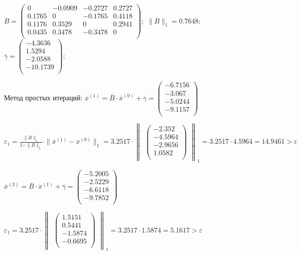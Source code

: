 \documentclass[10pt, a4paper]{scrartcl}
\begin{document}
\(\displaystyle B = \begin{pmatrix} 0 & -0.0909 & -0.2727 & 0.2727\\ 0.1765 & 0 & -0.1765 & 0.4118\\ 0.1176 & 0.3529 & 0 & 0.2941\\ 0.0435 & 0.3478 & -0.3478 & 0\\ \end{pmatrix};\)
\(\displaystyle \parallel \overline{B} \parallel _1 = 0.7648;\)
\(\displaystyle \overline{\gamma} = \begin{pmatrix} -4.3636\\ 1.5294\\ -2.0588\\ -10.1739\\ \end{pmatrix};\)

Метод простых итераций:
\(\overline{x}^{(1)} = \overline{B} \cdot \overline{x}^{(0)} + \overline{\gamma} = \begin{pmatrix} -6.7156\\ -3.067\\ -5.0244\\ -9.1157\\ \end{pmatrix}\)

\(\varepsilon_1 = \frac{\parallel B \parallel _1}{1 - \parallel B \parallel _1} \cdot \parallel \overline{x}^{(1)} - \overline{x}^{(0)} \parallel _1 = 3.2517 \cdot \begin{Vmatrix}\begin{pmatrix} -2.352\\ -4.5964\\ -2.9656\\ 1.0582\\ \end{pmatrix}\end{Vmatrix} _1 = 3.2517 \cdot 4.5964 = 14.9461 > \varepsilon\)

\(\overline{x}^{(2)} = \overline{B} \cdot \overline{x}^{(1)} + \overline{\gamma} = \begin{pmatrix} -5.2005\\ -2.5229\\ -6.6118\\ -9.7852\\ \end{pmatrix}\)

\(\varepsilon_1 = 3.2517 \cdot \begin{Vmatrix}\begin{pmatrix} 1.5151\\ 0.5441\\ -1.5874\\ -0.6695\\ \end{pmatrix}\end{Vmatrix} _1 = 3.2517 \cdot 1.5874 = 5.1617 > \varepsilon\)
\end{document}
